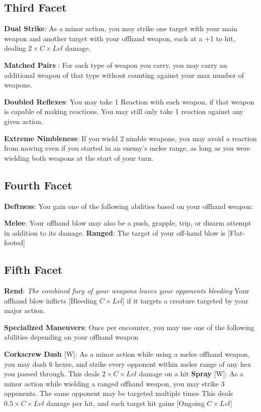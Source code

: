 \begin{multicols*}{2}
\subsection*{Third Facet\perk}
\textbf{Dual Strike}: As a minor action, you may strike one target with your main weapon and another target with your offhand weapon, each at a +1 to hit, dealing $2\times C\times Lvl$ damage.

\textbf{Matched Pairs} : For each type of weapon you carry, you may carry an additional weapon of that type without counting against your max number of weapons.

\textbf{Doubled Reflexes}: You may take 1 Reaction with each weapon, if that weapon is capable of making reactions. You may still only take 1 reaction against any given action.

\textbf{Extreme Nimbleness}: If you wield 2 nimble weapons, you may avoid a reaction from moving even if you started in an enemy's melee range, as long as you were wielding both weapons at the start of your turn.

\subsection*{Fourth Facet}
\textbf{Deftness}: You gain one of the following abilities based on your offhand weapon:
\begin{itemize}
\thing \textbf{Melee}: Your offhand blow may also be a push, grapple, trip, or disarm attempt in addition to its damage.
\thing \textbf{Ranged}: The target of your off-hand blow is [Flat-footed]
\end{itemize}

\subsection*{Fifth Facet\perk}
\textbf{Rend}: \emph{The combined fury of your weapons leaves your opponents bleeding} Your offhand blow inflicts [Bleeding $C\times Lvl$] if it targets a creature targeted by your major action.

\textbf{Specialized Maneuvers}: Once per encounter, you may use one of the following abilities depending on your offhand weapon
\begin{itemize}
\thing \textbf{Corkscrew Dash} [W]: As a minor action while using a melee offhand weapon, you may dash 6 hexes, and strike every opponent within melee range of any hex you passed through. This deals $2\times C\times Lvl$ damage on a hit
\thing \textbf{Spray} [W]: As a minor action while wielding a ranged offhand weapon, you may strike 3 opponents. The same opponent may be targeted multiple times This deals $0.5 \times C \times Lvl$ damage per hit, and each target hit gains [Ongoing $C\times Lvl$]
\end{itemize}


\end{multicols*}
